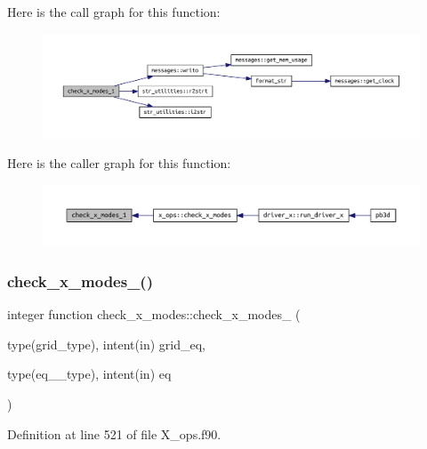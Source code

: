 Here is the call graph for this function\+:
\nopagebreak
\begin{figure}[H]
\begin{center}
\leavevmode
\includegraphics[width=350pt]{X__ops_8f90_a02770f90fcd38f73e7b6c7f267f17708_cgraph}
\end{center}
\end{figure}
Here is the caller graph for this function\+:
\nopagebreak
\begin{figure}[H]
\begin{center}
\leavevmode
\includegraphics[width=350pt]{X__ops_8f90_a02770f90fcd38f73e7b6c7f267f17708_icgraph}
\end{center}
\end{figure}
\mbox{\label{X__ops_8f90_a9fba21ce7e69eeb679c06ac453ed41ce}} 
\subsubsection{\texorpdfstring{check\+\_\+x\+\_\+modes\+\_()}{check\_x\_modes\_2()}}
{\footnotesize\ttfamily integer function check\+\_\+x\+\_\+modes\+::check\+\_\+x\+\_\+modes\+\_ (\begin{DoxyParamCaption}\item[{type(grid\+\_\+type), intent(in)}]{grid\+\_\+eq,  }\item[{type(eq\+\_\+1\+\_\+type), intent(in)}]{eq }\end{DoxyParamCaption})}



Definition at line 521 of file X\+\_\+ops.\+f90.

